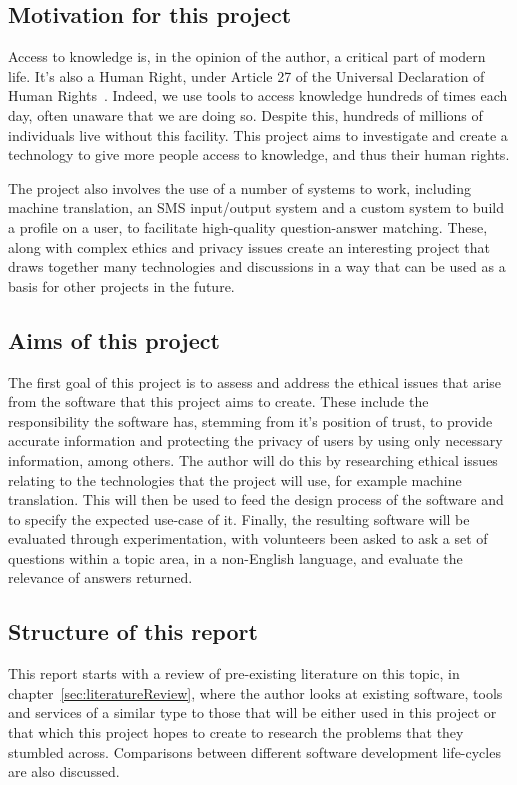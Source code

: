\documentclass{article}
\begin{document}
\subsection{Motivation for this project}
Access to knowledge is, in the opinion of the author, a critical part of modern life.  It's also a Human Right, under Article 27 of the Universal Declaration of Human Rights~\cite{community1948universal}.  Indeed, we use tools to access knowledge hundreds of times each day, often unaware that we are doing so.  Despite this, hundreds of millions of individuals live without this facility.  This project aims to investigate and create a technology to give more people access to knowledge, and thus their human rights.

The project also involves the use of a number of systems to work, including machine translation, an SMS input/output system and a custom system to build a profile on a user, to facilitate high-quality question-answer matching.  These, along with complex ethics and privacy issues create an interesting project that draws together many technologies and discussions in a way that can be used as a basis for other projects in the future.

\subsection{Aims of this project}

The first goal of this project is to assess and address the ethical issues that arise from the software that this project aims to create.  These include the responsibility the software has, stemming from it's position of trust, to provide accurate information and protecting the privacy of users by using only necessary information, among others.  The author will do this by researching ethical issues relating to the technologies that the project will use, for example machine translation.  This will then be used to feed the design process of the software and to specify the expected use-case of it.  Finally, the resulting software will be evaluated through experimentation, with volunteers been asked to ask a set of questions within a topic area, in a non-English language, and evaluate the relevance of answers returned.

\subsection{Structure of this report}
This report starts with a review of pre-existing literature on this topic, in chapter~\ref{sec:literatureReview}, where the author looks at existing software, tools and services of a similar type to those that will be either used in this project or that which this project hopes to create to research the problems that they stumbled across.  Comparisons between different software development life-cycles are also discussed.
\end{document}
